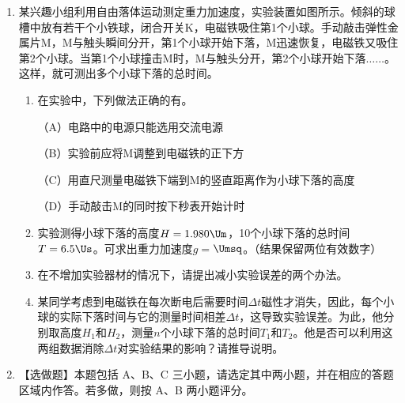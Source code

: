 \documentclass[\gkver]{gaokaozhenti}
\begin{document}
\begin{enumerate}
\item
某兴趣小组利用自由落体运动测定重力加速度，实验装置如图所示。倾斜的球槽中放有若干个小铁球，闭合开关K，电磁铁吸住第1个小球。手动敲击弹性金属片M，M与触头瞬间分开，第1个小球开始下落，M迅速恢复，电磁铁又吸住第2个小球。当第1个小球撞击M时，M与触头分开，第2个小球开始下落$\ldots\ldots$。这样，就可测出多个小球下落的总时间。
\begin{enumerate}
	\item
	在实验中，下列做法正确的有。

	（A）电路中的电源只能选用交流电源

	（B）实验前应将M调整到电磁铁的正下方

	（C）用直尺测量电磁铁下端到M的竖直距离作为小球下落的高度

	（D）手动敲击M的同时按下秒表开始计时
	\item
	实验测得小球下落的高度$H=1.980\Um$，10个小球下落的总时间$T=6.5\Us$。可求出重力加速度$g=$$\Umsq$。（结果保留两位有效数字）
	\item
	在不增加实验器材的情况下，请提出减小实验误差的两个办法。
	\item
	某同学考虑到电磁铁在每次断电后需要时间$\Delta t$磁性才消失，因此，每个小球的实际下落时间与它的测量时间相差$\Delta t$，这导致实验误差。为此，他分别取高度$H_{1}$和$H_{2}$，测量$n$个小球下落的总时间$T_{1}$和$T_{2}$。他是否可以利用这两组数据消除$\Delta t$对实验结果的影响？请推导说明。
\end{enumerate}

\item
【选做题】本题包括 A、B、C 三小题，请选定其中两小题，并在相应的答题区域内作答。若多做，则按 A、B 两小题评分。


\end{enumerate}
\end{document}
